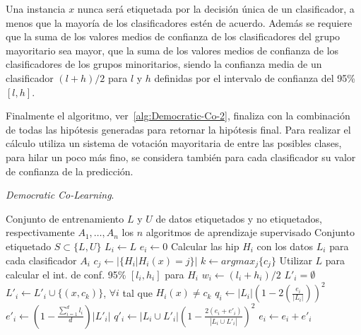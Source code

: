 Una instancia $x$ nunca será etiquetada por la decisión única de un clasificador, a menos que la mayoría de los clasificadores estén de acuerdo. Además se requiere que la suma de los valores medios de confianza de los clasificadores del grupo mayoritario sea mayor, que la suma de los valores medios de confianza de los clasificadores de los grupos minoritarios, siendo la confianza media de un clasificador $\left( l + h \right) / 2$ para $l$ y $h$ definidas por el intervalo de confianza del 95\% $\left[l,h\right]$.

Finalmente el algoritmo, ver~\ref{alg:Democratic-Co-2}, finaliza con la combinación de todas las hipótesis generadas para retornar la hipótesis final. Para realizar el cálculo utiliza un sistema de votación mayoritaria de entre las posibles clases, para hilar un poco más fino, se considera también para cada clasificador su valor de confianza de la predicción. 

\begin{algorithm}
\caption{\textit{Democratic Co-Learning}.}\label{alg:Democratic-Co}
\begin{algorithmic}[1]
\Require Conjunto de entrenamiento $L$ y $U$ de datos etiquetados y no etiquetados, respectivamente
\Require $A_1,\dots , A_n$ los $n$ algoritmos de aprendizaje supervisado
\Ensure Conjunto etiquetado $S \subset \lbrace L,U \rbrace$
\Statex
{}
		\State $L_i \leftarrow L$
		\State $e_i \leftarrow 0$ 
	\EndFor
	\Repeat
			\State Calcular las hip $H_i$ con los datos $L_i$ para cada clasificador $A_i$
		\EndFor
				\State $c_j \leftarrow \left|\lbrace H_i | H_i\left(x\right) = j \rbrace\right|$
			\EndFor
			\State $k \leftarrow arg max_j \lbrace c_j\rbrace$
		\EndFor
			\State Utilizar $L$ para calcular el int. de conf. 95\% $\left[l_i, h_i\right]$ para $H_i$
			\State $w_i \leftarrow \left(l_i + h_i \right)/2$
				\State $L'_i = \emptyset$
			\EndFor
				\State $L'_i \leftarrow L'_i \cup \lbrace\left(x, c_k\right)\rbrace$, $\forall i$ tal que $H_i(x) \not= c_k$
			\EndIf
		\EndFor
			\State $q_i \leftarrow \left| L_i\right| \left(1-2\left(\frac{e_i}{\left|L_i\right|}\right)\right)^2$
			\State $e'_i \leftarrow \left(1-\frac{\sum_{i=1}^{d}l_i}{d}\right) \left|L'_i\right|$
			\State $q'_i \leftarrow \left| L_i \cup L'_i \right| \left(1-\frac{2\left(e_i+e'_i\right)}{\left|L_i \cup L'_i\right|}\right)^2$			
		\EndFor
			\State $e_i \leftarrow e_i + e'_i$
		\EndIf
\end{algorithmic}
\end{algorithm}

